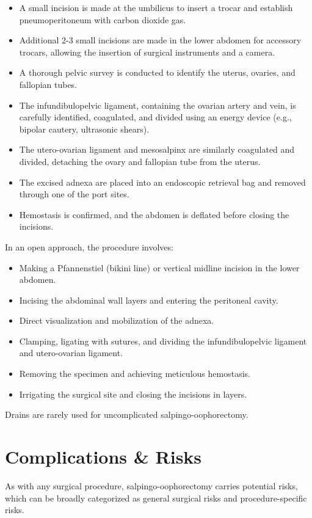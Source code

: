\begin{itemize}
  \item A small incision is made at the umbilicus to insert a trocar and establish pneumoperitoneum with carbon dioxide gas.
  \item Additional 2-3 small incisions are made in the lower abdomen for accessory trocars, allowing the insertion of surgical instruments and a camera.
  \item A thorough pelvic survey is conducted to identify the uterus, ovaries, and fallopian tubes.
  \item The infundibulopelvic ligament, containing the ovarian artery and vein, is carefully identified, coagulated, and divided using an energy device (e.g., bipolar cautery, ultrasonic shears).
  \item The utero-ovarian ligament and mesosalpinx are similarly coagulated and divided, detaching the ovary and fallopian tube from the uterus.
  \item The excised adnexa are placed into an endoscopic retrieval bag and removed through one of the port sites.
  \item Hemostasis is confirmed, and the abdomen is deflated before closing the incisions.
\end{itemize}

In an open approach, the procedure involves:

\begin{itemize}
  \item Making a Pfannenstiel (bikini line) or vertical midline incision in the lower abdomen.
  \item Incising the abdominal wall layers and entering the peritoneal cavity.
  \item Direct visualization and mobilization of the adnexa.
  \item Clamping, ligating with sutures, and dividing the infundibulopelvic ligament and utero-ovarian ligament.
  \item Removing the specimen and achieving meticulous hemostasis.
  \item Irrigating the surgical site and closing the incisions in layers.
\end{itemize}

Drains are rarely used for uncomplicated salpingo-oophorectomy.

\section*{Complications \& Risks}
As with any surgical procedure, salpingo-oophorectomy carries potential risks, which can be broadly categorized as general surgical risks and procedure-specific risks.


